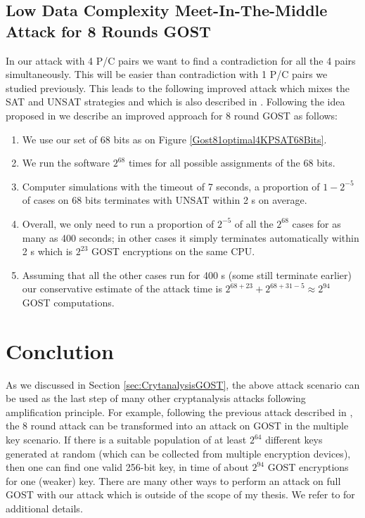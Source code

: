 
\subsection{Low Data Complexity Meet-In-The-Middle Attack for 8 Rounds GOST}
\label{section:Fact8R4KP_94_SATMethod}
In our attack with 4 P/C pairs we want to find a contradiction for all the 4 pairs simultaneously.
This will be easier than contradiction with 1 P/C pairs we studied previously.
This leads to the following improved attack
which mixes the SAT and UNSAT strategies
and which is also described in \cite{gostlow8r}.
Following the idea proposed in \cite{gostlow8r} we describe an improved approach for 8 round GOST as follows:

\begin{enumerate}
	\item
	We use our set of 68 bits as
	on Figure \ref{Gost81optimal4KPSAT68Bits}. %
	\item
	We run the software $2^{68}$ times for all possible assignments of the 68 bits.
	\item
	Computer simulations
	with the timeout of 7 seconds,
	a proportion of $1-2^{-5}$ of cases on 68 bits terminates with UNSAT
	within 2 s on average.
	\item
	Overall, we only need to run a proportion of $2^{-5}$ of all the $2^{68}$ cases
	for as many as 400 seconds;
	in other cases it simply terminates automatically within 2 s
	which is $2^{23}$ GOST encryptions on the same CPU.
	\item
	Assuming that all the other cases run for 400 s (some still terminate earlier)
	our conservative estimate of the attack time is
	$2^{68+23}+2^{68+31-5}\approx 2^{94}$ GOST computations.
\end{enumerate}

\section{Conclution}
As we discussed in Section \ref{sec:CrytanalysisGOST}, the above attack scenario can be used as  the last step of many other cryptanalysis attacks following amplification principle. For example, following the previous attack described in \cite{gostlow8r}, the 8 round attack can be transformed into an attack on GOST in the multiple key scenario. If there is a suitable %
population of at least $2^{64}$ different keys generated at random (which can be collected from multiple encryption devices), then one can find one valid 256-bit key, in time of about $2^{94}$ GOST encryptions for one (weaker) key. There are many other ways to perform an attack on full GOST with our attack which is outside of the scope of my thesis. We refer to \cite{gostreport,gostlow8r,gostac} for additional details.

